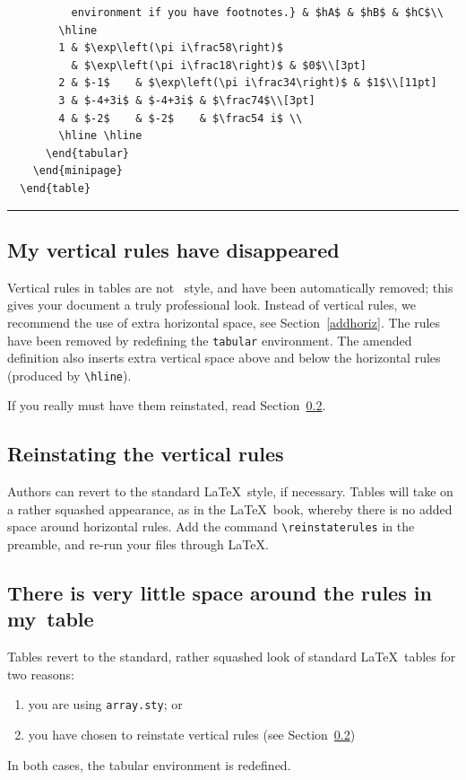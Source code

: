 \begin{table}
\begin{verbatim}
          environment if you have footnotes.} & $hA$ & $hB$ & $hC$\\
        \hline
        1 & $\exp\left(\pi i\frac58\right)$
          & $\exp\left(\pi i\frac18\right)$ & $0$\\[3pt]
        2 & $-1$    & $\exp\left(\pi i\frac34\right)$ & $1$\\[11pt]
        3 & $-4+3i$ & $-4+3i$ & $\frac74$\\[3pt]
        4 & $-2$    & $-2$    & $\frac54 i$ \\
        \hline \hline
      \end{tabular}
    \end{minipage}
  \end{table}
\end{verbatim}
\rule[20pt]{\textwidth}{0.5pt}
  \end{table}

\subsection{My vertical rules have disappeared}

Vertical rules in tables are not \cambridge\ style, and have been automatically removed; this gives your document a truly professional look. Instead of vertical rules, we recommend the use of extra horizontal space, see Section~\ref{addhoriz}. The rules have been removed by redefining the \verb"tabular" environment. The amended definition also inserts extra vertical space above and below the horizontal rules (produced by \verb"\hline").

If you really must have them reinstated, read Section~\ref{reinstate}.

\subsection{Reinstating the vertical rules}
\label{reinstate}
Authors can revert to the standard \LaTeX\ style, if necessary. Tables will take on a rather squashed appearance, as in the \LaTeX\ book, whereby there is no added space around horizontal rules. Add the command \verb"\reinstaterules" in the preamble, and re-run your files through \LaTeX.

\subsection{There is very little space around the rules in my~table}
Tables revert to the standard, rather squashed look of standard \LaTeX\ tables for two reasons:
\begin{enumerate}
  \item you are using \verb"array.sty"; or
  \item you have chosen to reinstate vertical rules (see Section~\ref{reinstate})
\end{enumerate}
In both cases, the tabular environment is redefined.


